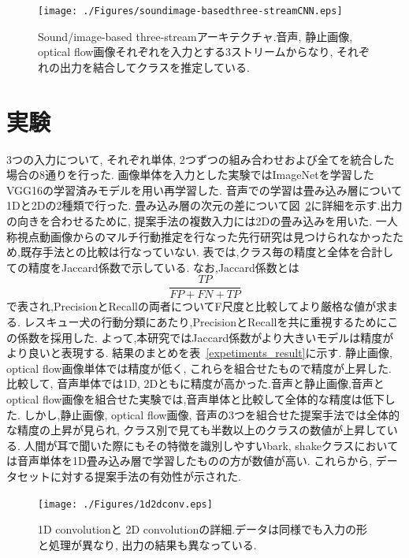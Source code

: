 \documentclass[MIRU,submit]{miru2019j}
\begin{document}
\begin{figure}[tb]
   \begin{center}
    \texttt{[image: ./Figures/soundimage-basedthree-streamCNN.eps]}
    \caption{Sound/image-based three-streamアーキテクチャ.音声, 静止画像, optical flow画像それぞれを入力とする3ストリームからなり, それぞれの出力を結合してクラスを推定している.}
    \label{sound3st}
   \end{center}
\end{figure}

\section{実験}

3つの入力について, それぞれ単体, 2つずつの組み合わせおよび全てを統合した場合の8通りを行った.%
画像単体を入力とした実験ではImageNetを学習したVGG16の学習済みモデルを用い再学習した.
音声での学習は畳み込み層について1Dと2Dの2種類で行った.
畳み込み層の次元の差について図~\ref{1d2dconv}に詳細を示す.出力の向きを合わせるために, 提案手法の複数入力には2Dの畳み込みを用いた.
一人称視点動画像からのマルチ行動推定を行なった先行研究は見つけられなかったため,既存手法との比較は行なっていない.
表では,クラス毎の精度と全体を合計しての精度をJaccard係数で示している.
なお,Jaccard係数とは$$\frac{TP}{FP+FN+TP}$$で表され,PrecisionとRecallの両者についてF尺度と比較してより厳格な値が求まる.
レスキュー犬の行動分類にあたり,PrecisionとRecallを共に重視するためにこの係数を採用した.
よって,本研究ではJaccard係数がより大きいモデルは精度がより良いと表現する.
結果のまとめを表~\ref{expetiments_result}に示す.
静止画像, optical flow画像単体では精度が低く, これらを組合せたもので精度が上昇した.
比較して, 音声単体では1D, 2Dともに精度が高かった.音声と静止画像,音声とoptical flow画像を組合せた実験では,音声単体と比較して全体的な精度は低下した.
しかし,静止画像, optical flow画像, 音声の3つを組合せた提案手法では全体的な精度の上昇が見られ, クラス別で見ても半数以上のクラスの数値が上昇している.
人間が耳で聞いた際にもその特徴を識別しやすいbark, shakeクラスにおいては音声単体を1D畳み込み層で学習したものの方が数値が高い.
これらから, データセットに対する提案手法の有効性が示された.

\begin{figure}[tb]
   \begin{center}
    \texttt{[image: ./Figures/1d2dconv.eps]}
    \caption{1D convolutionと 2D convolutionの詳細.データは同様でも入力の形と処理が異なり, 出力の結果も異なっている.}
    \label{1d2dconv}
   \end{center}
\end{figure}
\end{document}
